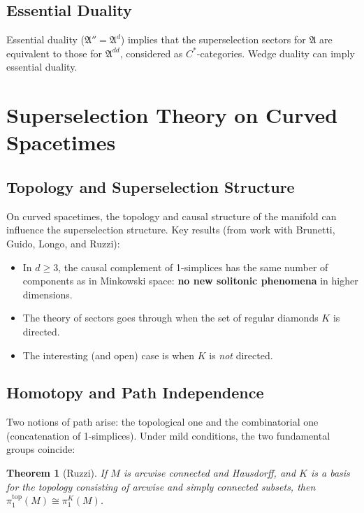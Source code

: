 \documentclass[11pt,a4paper]{article}
\newtheorem{theorem}{Theorem}[section]
\begin{document}
\subsection{Essential Duality}

Essential duality ($\mathfrak{A}'' = \mathfrak{A}^d$) implies that the
superselection sectors for $\mathfrak{A}$ are equivalent to those for
$\mathfrak{A}^{dd}$, considered as $C^*$-categories. Wedge duality can
imply essential duality.

\section{Superselection Theory on Curved Spacetimes}

\subsection{Topology and Superselection Structure}

On curved spacetimes, the topology and causal structure of the manifold
can influence the superselection structure. Key results (from work with
Brunetti, Guido, Longo, and Ruzzi):
\begin{itemize}[nosep]
  \item In $d \geq 3$, the causal complement of 1-simplices has the same
        number of components as in Minkowski space: \textbf{no new solitonic
        phenomena} in higher dimensions.
  \item The theory of sectors goes through when the set of regular diamonds
        $K$ is directed.
  \item The interesting (and open) case is when $K$ is \emph{not} directed.
\end{itemize}

\subsection{Homotopy and Path Independence}

Two notions of path arise: the topological one and the combinatorial one
(concatenation of 1-simplices). Under mild conditions, the two fundamental
groups coincide:

\begin{theorem}[Ruzzi]
If $M$ is arcwise connected and Hausdorff, and $K$ is a basis for the
topology consisting of arcwise and simply connected subsets, then
$\pi_1^{\mathrm{top}}(M) \cong \pi_1^K(M)$.
\end{theorem}
\end{document}
